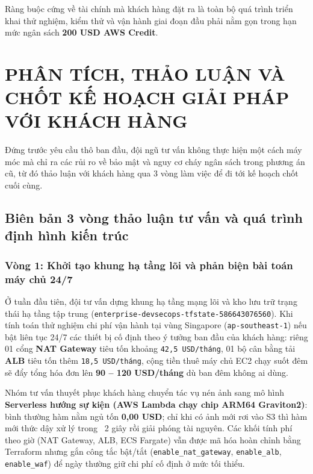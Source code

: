 \documentclass[12pt,a4paper]{report}
\begin{document}
Ràng buộc cứng về tài chính mà khách hàng đặt ra là toàn bộ quá trình triển khai thử nghiệm, kiểm thử và vận hành giai đoạn đầu phải nằm gọn trong hạn mức ngân sách \textbf{200 USD AWS Credit}.

\chapter{PHÂN TÍCH, THẢO LUẬN VÀ CHỐT KẾ HOẠCH GIẢI PHÁP VỚI KHÁCH HÀNG}

Đứng trước yêu cầu thô ban đầu, đội ngũ tư vấn không thực hiện một cách máy móc mà chỉ ra các rủi ro về bảo mật và nguy cơ cháy ngân sách trong phương án cũ, từ đó thảo luận với khách hàng qua 3 vòng làm việc để đi tới kế hoạch chốt cuối cùng.

\section{Biên bản 3 vòng thảo luận tư vấn và quá trình định hình kiến trúc}

\subsection{Vòng 1: Khởi tạo khung hạ tầng lõi và phản biện bài toán máy chủ 24/7}
Ở tuần đầu tiên, đội tư vấn dựng khung hạ tầng mạng lõi và kho lưu trữ trạng thái hạ tầng tập trung (\texttt{enterprise-devsecops-tfstate-586643076560}). Khi tính toán thử nghiệm chi phí vận hành tại vùng Singapore (\texttt{ap-southeast-1}) nếu bật liên tục 24/7 các thiết bị cố định theo ý tưởng ban đầu của khách hàng: riêng 01 cổng \textbf{NAT Gateway} tiêu tốn khoảng \texttt{42,5 USD/tháng}, 01 bộ cân bằng tải \textbf{ALB} tiêu tốn thêm \texttt{18,5 USD/tháng}, cộng tiền thuê máy chủ EC2 chạy suốt đêm sẽ đẩy tổng hóa đơn lên \textbf{90 -- 120 USD/tháng} dù ban đêm không ai dùng.

Nhóm tư vấn thuyết phục khách hàng chuyển tác vụ nén ảnh sang mô hình \textbf{Serverless hướng sự kiện (AWS Lambda chạy chip ARM64 Graviton2)}: bình thường hàm nằm ngủ tốn \textbf{0,00 USD}; chỉ khi có ảnh mới rơi vào S3 thì hàm mới thức dậy xử lý trong ~2 giây rồi giải phóng tài nguyên. Các khối tính phí theo giờ (NAT Gateway, ALB, ECS Fargate) vẫn được mã hóa hoàn chỉnh bằng Terraform nhưng gắn công tắc bật/tắt (\texttt{enable\_nat\_gateway}, \texttt{enable\_alb}, \texttt{enable\_waf}) để ngày thường giữ chi phí cố định ở mức tối thiểu.
\end{document}
